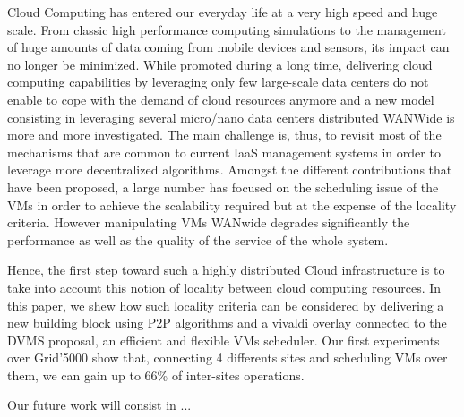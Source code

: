 
Cloud Computing has entered our everyday life at a very high speed and huge
scale. From classic high performance computing simulations to the management of
huge amounts of data coming from mobile devices and sensors, its impact can no
longer be minimized.
While promoted during a long time, delivering cloud computing capabilities by
leveraging only few large-scale data centers do not enable to cope with the
demand of cloud resources anymore and a new model consisting in leveraging
several micro/nano data centers distributed WANWide is more and more
investigated.
The main challenge is, thus, to revisit most of the mechanisms that are common
to current IaaS management systems in order to leverage more decentralized
algorithms. Amongst the different contributions that have been proposed, a large number has focused on the scheduling issue of the VMs 
in order to achieve the scalability required but at the expense of the locality criteria. 
However manipulating VMs WANwide degrades significantly the performance as well as the quality of the service of the whole system. 

% 

Hence, the first step toward such a highly distributed Cloud infrastructure is to take
into account this notion of locality between cloud computing resources.  In
this paper, we shew how such locality criteria can be considered by delivering a new building block
using  P2P algorithms and a vivaldi overlay connected to the DVMS proposal, an efficient and
flexible VMs scheduler.  Our first experiments over Grid'5000 show that,
connecting 4 differents sites and scheduling VMs over them, we can gain up to
66\% of inter-sites operations. 

Our future work will consist in ... 
